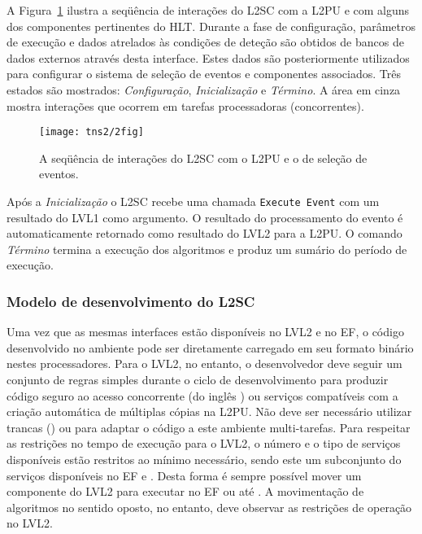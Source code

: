 A Figura~\ref{fig:l2sc-interaction} ilustra a seqüência de interações do L2SC
com a L2PU e com alguns dos componentes pertinentes do HLT. Durante a fase de
configuração, parâmetros de execução e dados atrelados às condições de deteção
são obtidos de bancos de dados externos através desta interface. Estes dados
são posteriormente utilizados para configurar o sistema de seleção de eventos
e componentes associados. Três estados são mostrados: \textit{Configuração},
\textit{Inicialização} e \textit{Término}. A área em cinza mostra interações
que ocorrem em tarefas processadoras (concorrentes).

\begin{figure}
\begin{center}
\texttt{[image: tns2/2fig]}
\end{center}
\caption{A seqüência de interações do L2SC com o L2PU e o  de
seleção de eventos.}
\label{fig:l2sc-interaction}
\end{figure}

Após a \textit{Inicialização} o L2SC recebe uma chamada \texttt{Execute Event}
com um resultado do LVL1 como argumento. O resultado do processamento do
evento é automaticamente retornado como resultado do LVL2 para a L2PU. O
comando \textit{Término} termina a execução dos algoritmos e produz um sumário
do período de execução.

\subsubsection{Modelo de desenvolvimento do L2SC}

Uma vez que as mesmas interfaces estão disponíveis no LVL2 e no EF, o código
desenvolvido no ambiente  pode ser diretamente carregado em seu
formato binário nestes processadores. Para o LVL2, no entanto, o desenvolvedor
deve seguir um conjunto de regras simples \cite{aa:lvl2-coding} durante o
ciclo de desenvolvimento para produzir código seguro ao acesso concorrente (do
inglês ) ou serviços compatíveis com a criação automática de
múltiplas cópias na L2PU. Não deve ser necessário utilizar trancas
() ou  para adaptar o código a este ambiente
multi-tarefas. Para respeitar as restrições no tempo de execução para o LVL2, o
número e o tipo de serviços disponíveis estão restritos ao mínimo necessário,
sendo este um subconjunto do serviços disponíveis no EF e . Desta
forma é sempre possível mover um componente do LVL2 para executar no EF ou até
. A movimentação de algoritmos no sentido oposto, no entanto,
deve observar as restrições de operação no LVL2.

